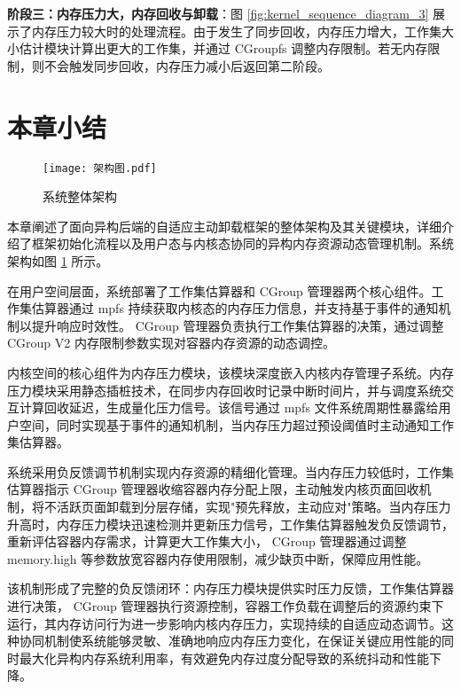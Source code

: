 \textbf{阶段三：内存压力大，内存回收与卸载}：图 \ref{fig:kernel_sequence_diagram_3} 展示了内存压力较大时的处理流程。由于发生了同步回收，内存压力增大，工作集大小估计模块计算出更大的工作集，并通过  CGroupfs  调整内存限制。若无内存限制，则不会触发同步回收，内存压力减小后返回第二阶段。

\section{本章小结}

\begin{figure}[h]
    \centering
    \texttt{[image: 架构图.pdf]}
    \caption{系统整体架构}
    \label{fig:system_architecture}
\end{figure}

本章阐述了面向异构后端的自适应主动卸载框架的整体架构及其关键模块，详细介绍了框架初始化流程以及用户态与内核态协同的异构内存资源动态管理机制。系统架构如图 \ref{fig:system_architecture} 所示。

在用户空间层面，系统部署了工作集估算器和  CGroup  管理器两个核心组件。工作集估算器通过  mpfs  持续获取内核态的内存压力信息，并支持基于事件的通知机制以提升响应时效性。 CGroup  管理器负责执行工作集估算器的决策，通过调整  CGroup  V2 内存限制参数实现对容器内存资源的动态调控。

内核空间的核心组件为内存压力模块，该模块深度嵌入内核内存管理子系统。内存压力模块采用静态插桩技术，在同步内存回收时记录中断时间片，并与调度系统交互计算回收延迟，生成量化压力信号。该信号通过 mpfs 文件系统周期性暴露给用户空间，同时实现基于事件的通知机制，当内存压力超过预设阈值时主动通知工作集估算器。

系统采用负反馈调节机制实现内存资源的精细化管理。当内存压力较低时，工作集估算器指示  CGroup  管理器收缩容器内存分配上限，主动触发内核页面回收机制，将不活跃页面卸载到分层存储，实现"预先释放，主动应对"策略。当内存压力升高时，内存压力模块迅速检测并更新压力信号，工作集估算器触发负反馈调节，重新评估容器内存需求，计算更大工作集大小， CGroup  管理器通过调整 memory.high 等参数放宽容器内存使用限制，减少缺页中断，保障应用性能。

该机制形成了完整的负反馈闭环：内存压力模块提供实时压力反馈，工作集估算器进行决策， CGroup  管理器执行资源控制，容器工作负载在调整后的资源约束下运行，其内存访问行为进一步影响内核内存压力，实现持续的自适应动态调节。这种协同机制使系统能够灵敏、准确地响应内存压力变化，在保证关键应用性能的同时最大化异构内存系统利用率，有效避免内存过度分配导致的系统抖动和性能下降。
